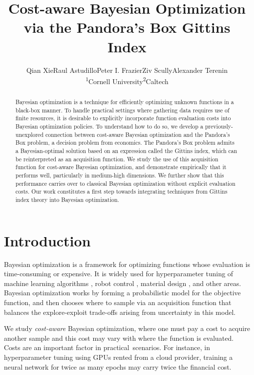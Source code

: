 \documentclass{article}
\title{Cost-aware Bayesian Optimization\\via the Pandora's Box Gittins Index}
\author{Qian Xie\rlap{\textsuperscript{\ensuremath{1}}}\qquad Raul Astudillo\rlap{\textsuperscript{\ensuremath{2}}}\qquad Peter I. Frazier\rlap{\textsuperscript{\ensuremath{1}}}\qquad Ziv Scully\rlap{\textsuperscript{\ensuremath{1}}}\qquad Alexander Terenin\rlap{\textsuperscript{\ensuremath{1}}}\\\textsuperscript{\ensuremath{1}}Cornell University\qquad\textsuperscript{\ensuremath{2}}Caltech}
\begin{document}
\maketitle


\begin{abstract}
Bayesian optimization is a technique for efficiently optimizing unknown functions in a black-box manner. To handle practical settings where gathering data requires use of finite resources, it is desirable to explicitly incorporate function evaluation costs into Bayesian optimization policies. To understand how to do so, we develop a previously-unexplored connection between cost-aware Bayesian optimization and the Pandora's Box problem, a decision problem from economics. The Pandora's Box problem admits a Bayesian-optimal solution based on an expression called the Gittins index, which can be reinterpreted as an acquisition function. We study the use of this acquisition function for cost-aware Bayesian optimization, and demonstrate empirically that it performs well, particularly in medium-high dimensions. We further show that this performance carries over to classical Bayesian optimization without explicit evaluation costs. Our work constitutes a first step towards integrating techniques from Gittins index theory into Bayesian optimization.
\end{abstract}

\bgroup
\let\thefootnote\relax
{}
\egroup

\section{Introduction}

Bayesian optimization is a framework for optimizing functions whose evaluation is time-consuming or expensive.
It is widely used for hyperparameter tuning of machine learning algorithms \cite{snoek2012practical}, robot control \cite{martinez2017bayesian}, material design \cite{zhang2020bayesian}, and other areas.
Bayesian optimization works by forming a probabilistic model for the objective function, and then chooses where to sample via an acquisition function that balances the explore-exploit trade-offs arising from uncertainty in this model.

We study \emph{cost-aware} Bayesian optimization, where one must pay a cost to acquire another sample and this cost may vary with where the function is evaluated.
Costs are an important factor in practical~scenarios. 
For instance, in hyperparameter tuning using GPUs rented from a cloud provider, training a neural network for twice as many epochs may carry twice the financial cost.
\end{document}
